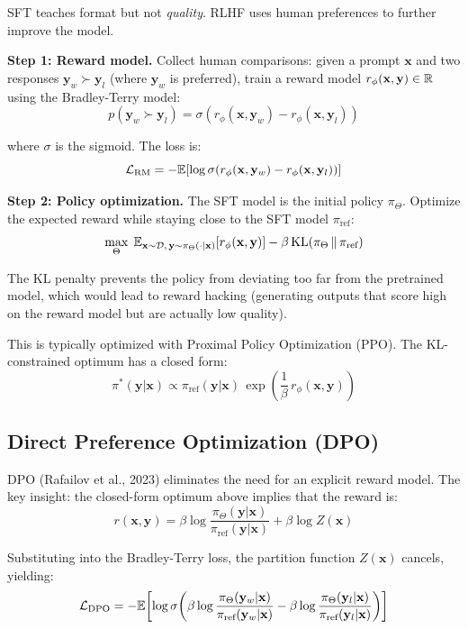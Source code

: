 \documentclass[main.tex]{subfiles}
\begin{document}
SFT teaches format but not \textit{quality}. RLHF uses human preferences to further improve the model.

\textbf{Step 1: Reward model.} Collect human comparisons: given a prompt $\mathbf{x}$ and two responses $\mathbf{y}_w \succ \mathbf{y}_l$ (where $\mathbf{y}_w$ is preferred), train a reward model $r_\phi(\mathbf{x}, \mathbf{y}) \in \mathbb{R}$ using the Bradley-Terry model:
$$p(\mathbf{y}_w \succ \mathbf{y}_l) = \sigma\!\left(r_\phi(\mathbf{x}, \mathbf{y}_w) - r_\phi(\mathbf{x}, \mathbf{y}_l)\right)$$

where $\sigma$ is the sigmoid. The loss is:
$$\mathcal{L}_{\text{RM}} = -\mathbb{E}\!\left[\log\sigma\!\left(r_\phi(\mathbf{x}, \mathbf{y}_w) - r_\phi(\mathbf{x}, \mathbf{y}_l)\right)\right]$$

\textbf{Step 2: Policy optimization.} The SFT model is the initial policy $\pi_\Theta$. Optimize the expected reward while staying close to the SFT model $\pi_{\text{ref}}$:
$$\max_\Theta \;\mathbb{E}_{\mathbf{x} \sim \mathcal{D},\, \mathbf{y} \sim \pi_\Theta(\cdot|\mathbf{x})}\!\left[r_\phi(\mathbf{x}, \mathbf{y})\right] - \beta\,\text{KL}\!\left(\pi_\Theta \,\|\, \pi_{\text{ref}}\right)$$

The KL penalty prevents the policy from deviating too far from the pretrained model, which would lead to reward hacking (generating outputs that score high on the reward model but are actually low quality).

This is typically optimized with Proximal Policy Optimization (PPO). The KL-constrained optimum has a closed form:
$$\pi^*(\mathbf{y}|\mathbf{x}) \propto \pi_{\text{ref}}(\mathbf{y}|\mathbf{x})\,\exp\!\left(\frac{1}{\beta}\,r_\phi(\mathbf{x}, \mathbf{y})\right)$$

\subsection{Direct Preference Optimization (DPO)}

DPO (Rafailov et al., 2023) eliminates the need for an explicit reward model. The key insight: the closed-form optimum above implies that the reward is:
$$r(\mathbf{x}, \mathbf{y}) = \beta\log\frac{\pi_\Theta(\mathbf{y}|\mathbf{x})}{\pi_{\text{ref}}(\mathbf{y}|\mathbf{x})} + \beta\log Z(\mathbf{x})$$

Substituting into the Bradley-Terry loss, the partition function $Z(\mathbf{x})$ cancels, yielding:
$$\mathcal{L}_{\text{DPO}} = -\mathbb{E}\!\left[\log\sigma\!\left(\beta\log\frac{\pi_\Theta(\mathbf{y}_w|\mathbf{x})}{\pi_{\text{ref}}(\mathbf{y}_w|\mathbf{x})} - \beta\log\frac{\pi_\Theta(\mathbf{y}_l|\mathbf{x})}{\pi_{\text{ref}}(\mathbf{y}_l|\mathbf{x})}\right)\right]$$
\end{document}

